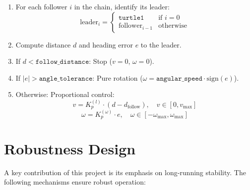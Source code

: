\documentclass[12pt,a4paper]{article}
\begin{document}
\begin{enumerate}
  \item For each follower $i$ in the chain, identify its leader:
  \[
    \text{leader}_i = \begin{cases} \texttt{turtle1} & \text{if } i = 0 \\ \text{follower}_{i-1} & \text{otherwise} \end{cases}
  \]

  \item Compute distance $d$ and heading error $e$ to the leader.

  \item If $d < \texttt{follow\_distance}$: Stop ($v = 0$, $\omega = 0$).

  \item If $|e| > \texttt{angle\_tolerance}$: Pure rotation ($\omega = \texttt{angular\_speed} \cdot \text{sign}(e)$).

  \item Otherwise: Proportional control:
  \[
    v = K_p^{(l)} \cdot (d - d_{\text{follow}}), \quad v \in [0, v_{\max}]
  \]
  \[
    \omega = K_p^{(\omega)} \cdot e, \quad \omega \in [-\omega_{\max}, \omega_{\max}]
  \]
\end{enumerate}

\section{Robustness Design}
\label{sec:robustness}

A key contribution of this project is its emphasis on long-running stability. The following mechanisms ensure robust operation:
\end{document}
